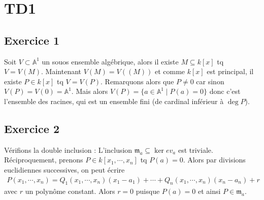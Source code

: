 \chapter{TD1}
    \section{Exercice 1}
        Soit $V \subset \mathbb{A}^1$ un souos ensemble algébrique, alors il existe $M \subseteq k[x]$ tq $V = V(M)$. Maintenant $V(M) = V((M))$ et comme $k[x]$ est principal, il existe $P \in k[x]$ tq $V = V(P)$. Remarquons alors que $P \neq 0$ car sinon $V(P) = V(0) = \mathbb{A}^1$. Mais alors $V(P) = \{a \in \mathbb{A}^1 \mid P(a) = 0\}$ donc c'est l'ensemble des racines, qui est un ensemble fini (de cardinal inférieur à $\deg P$).

    \section{Exercice 2}
        Vérifions la double inclusion : L'inclusion $\mathfrak{m}_a \subseteq \ker ev_a$ est triviale. Réciproquement, prenons $P \in k[x_1, \cdots, x_n]$ tq $P(a) = 0$. Alors par divisions euclidiennes successives, on peut écrire
        \begin{align*}
            P(x_1, \cdots, x_n) = Q_1(x_1, \cdots, x_n)(x_1 - a_1) + \cdots + Q_n(x_1, \cdots, x_n)(x_n - a_n) + r
        \end{align*}
        avec $r$ un polynôme constant. Alors $r = 0$ puisque $P(a) = 0$ et ainsi $P \in \mathfrak{m}_a$.

